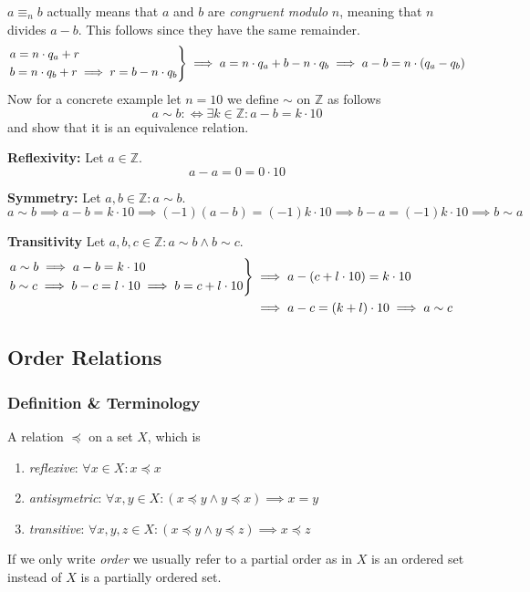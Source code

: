 \(a \equiv_n b\) actually means that \(a\) and \(b\) are \emph{congruent modulo} \(n\), meaning that \(n\) divides \(a - b\).
This follows since they have the same remainder.
\[\begin{drcases}a = n \cdot q_a + r\\b = n \cdot q_b + r \implies r = b - n \cdot q_b\end{drcases} \implies a = n \cdot q_a + b - n \cdot q_b \implies a - b = n \cdot (q_a - q_b)\]
Now for a concrete example let \(n = 10\) we define \(\sim\) on \(\mathbb{Z}\) as follows
\[a \sim b :\iff \exists k \in \mathbb{Z}: a - b = k \cdot 10\]
and show that it is an equivalence relation.

\textbf{Reflexivity:} Let \(a \in \mathbb{Z}\).
\[a - a = 0 = 0 \cdot 10\]

\textbf{Symmetry:} Let \(a, b \in \mathbb{Z}: a \sim b\).
\[a \sim b \implies a - b = k \cdot 10 \implies (-1)(a - b) = (-1)k \cdot 10 \implies b - a = (-1)k \cdot 10 \implies b \sim a\]

\textbf{Transitivity} Let \(a, b, c \in \mathbb{Z}: a \sim b \land b \sim c\).
\begin{equation*}
   \begin{split}
      \begin{drcases}a \sim b \implies a - b = k \cdot 10\\ b \sim c \implies b - c = l \cdot 10 \implies b = c + l \cdot 10\end{drcases} & \implies a - (c + l \cdot 10) = k \cdot 10\\
      & \implies a - c = (k + l) \cdot 10 \implies a \sim c
   \end{split}
\end{equation*}

\subsection{Order Relations}
\subsubsection{Definition \& Terminology}
\begin{definition}
   A relation \(\preceq\) on a set \(X\), which is
   \begin{enumerate}[label=\roman*, align=Center]
      \item \emph{reflexive}: \(\forall x \in X: x \preceq x\)
      \item \emph{antisymetric}: \(\forall x, y \in X: (x \preceq y \land y \preceq x) \implies x = y\)
      \item \emph{transitive}: \(\forall x, y, z \in X: (x \preceq y \land y \preceq z) \implies x \preceq z\)
   \end{enumerate}
\end{definition}
\begin{remark}[Terminology]
   If we only write \emph{order} we usually refer to a partial order as in \(X\) is an ordered set instead of \(X\) is a partially ordered set.
\end{remark}

